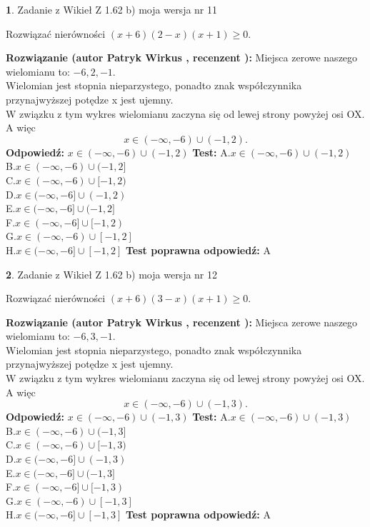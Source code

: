 \documentclass[12pt, a4paper]{article}
\theoremstyle{definition} %
\newtheorem{zad}{}
\newcommand{\zadStart}[1]{\begin{zad}#1\newline}
\newcommand{\zadStop}{\end{zad}}
\newcommand{\rozwStart}[2]{\noindent \textbf{Rozwiązanie (autor #1 , recenzent #2): }\newline}
\newcommand{\rozwStop}{\newline}
\newcommand{\odpStart}{\noindent \textbf{Odpowiedź:}\newline}
\newcommand{\odpStop}{\newline}
\newcommand{\testStart}{\noindent \textbf{Test:}\newline}
\newcommand{\testStop}{\newline}
\newcommand{\kluczStart}{\noindent \textbf{Test poprawna odpowiedź:}\newline}
\newcommand{\kluczStop}{\newline}
\begin{document}
\zadStart{Zadanie z Wikieł Z 1.62 b) moja wersja nr 11}

Rozwiązać nierówności $(x+6)(2-x)(x+1)\ge0$.
\zadStop
\rozwStart{Patryk Wirkus}{}
Miejsca zerowe naszego wielomianu to: $-6, 2, -1$.\\
Wielomian jest stopnia nieparzystego, ponadto znak współczynnika przy\linebreak najwyższej potędze x jest ujemny.\\ W związku z tym wykres wielomianu zaczyna się od lewej strony powyżej osi OX. A więc $$x \in (-\infty,-6) \cup (-1,2).$$
\rozwStop
\odpStart
$x \in (-\infty,-6) \cup (-1,2)$
\odpStop
\testStart
A.$x \in (-\infty,-6) \cup (-1,2)$\\
B.$x \in (-\infty,-6) \cup (-1,2]$\\
C.$x \in (-\infty,-6) \cup [-1,2)$\\
D.$x \in (-\infty,-6] \cup (-1,2)$\\
E.$x \in (-\infty,-6] \cup (-1,2]$\\
F.$x \in (-\infty,-6] \cup [-1,2)$\\
G.$x \in (-\infty,-6) \cup [-1,2]$\\
H.$x \in (-\infty,-6] \cup [-1,2]$
\testStop
\kluczStart
A
\kluczStop



\zadStart{Zadanie z Wikieł Z 1.62 b) moja wersja nr 12}

Rozwiązać nierówności $(x+6)(3-x)(x+1)\ge0$.
\zadStop
\rozwStart{Patryk Wirkus}{}
Miejsca zerowe naszego wielomianu to: $-6, 3, -1$.\\
Wielomian jest stopnia nieparzystego, ponadto znak współczynnika przy\linebreak najwyższej potędze x jest ujemny.\\ W związku z tym wykres wielomianu zaczyna się od lewej strony powyżej osi OX. A więc $$x \in (-\infty,-6) \cup (-1,3).$$
\rozwStop
\odpStart
$x \in (-\infty,-6) \cup (-1,3)$
\odpStop
\testStart
A.$x \in (-\infty,-6) \cup (-1,3)$\\
B.$x \in (-\infty,-6) \cup (-1,3]$\\
C.$x \in (-\infty,-6) \cup [-1,3)$\\
D.$x \in (-\infty,-6] \cup (-1,3)$\\
E.$x \in (-\infty,-6] \cup (-1,3]$\\
F.$x \in (-\infty,-6] \cup [-1,3)$\\
G.$x \in (-\infty,-6) \cup [-1,3]$\\
H.$x \in (-\infty,-6] \cup [-1,3]$
\testStop
\kluczStart
A
\kluczStop
\end{document}
